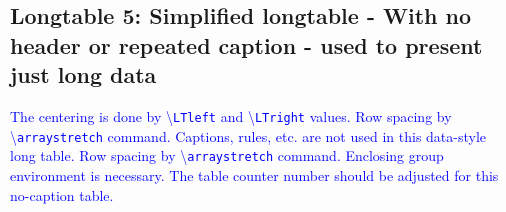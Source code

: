 \documentclass[phd,showgrids]{ndsu-thesis-2022}
\newcommand\italk[1]{\textcolor{blue}{#1}}  %
\newcommand\cmd[1]{\textbackslash\texttt{#1}}  %
\begin{document}
\subsection{Longtable 5: Simplified longtable - With no header or repeated caption - used to present just long data}

\italk{The centering is done by \cmd{LTleft} and \cmd{LTright} values. Row spacing by \cmd{arraystretch} command. Captions, rules, etc. are not used in this data-style long table. Row spacing by \cmd{arraystretch} command. Enclosing group environment is necessary. The table counter number should be adjusted for this no-caption table.}

\begingroup
\setlength{\LTleft}{0.5cm plus -1fill}%
\setlength{\LTright}{\LTleft}%
\renewcommand{\arraystretch}{0.6}%
\end{document}
